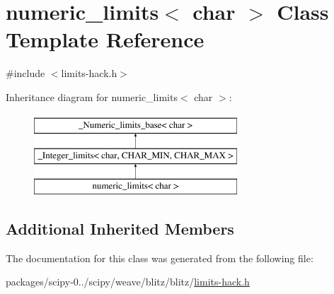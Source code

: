 \hypertarget{classnumeric__limits_3_01char_01_4}{}\section{numeric\+\_\+limits$<$ char $>$ Class Template Reference}
\label{classnumeric__limits_3_01char_01_4}


{\ttfamily \#include $<$limits-\/hack.\+h$>$}

Inheritance diagram for numeric\+\_\+limits$<$ char $>$\+:\begin{figure}[H]
\begin{center}
\leavevmode
\includegraphics[height=3.000000cm]{classnumeric__limits_3_01char_01_4}
\end{center}
\end{figure}
\subsection*{Additional Inherited Members}


The documentation for this class was generated from the following file\+:\begin{DoxyCompactItemize}
\item 
packages/scipy-\/0../scipy/weave/blitz/blitz/\hyperlink{limits-hack_8h}{limits-\/hack.\+h}\end{DoxyCompactItemize}
